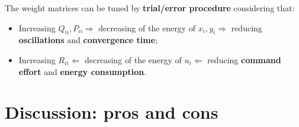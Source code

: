 \hspace*{-5mm}
%


The weight matrices can be tuned by \textbf{trial/error procedure} considering that: 
\begin{itemize}
    \item Increasing $Q_{ii}, P_{ii} \Rightarrow$ decreasing of the energy of $x_i, y_i \Rightarrow$ reducing \textbf{oscillations} and \textbf{convergence time}; 
    \item Increasing $R_{ii} \Leftarrow$ decreasing of the energy of $u_i \Leftarrow$ reducing \textbf{command effort} and \textbf{energy consumption}. 
\end{itemize}

\section{Discussion: pros and cons}
